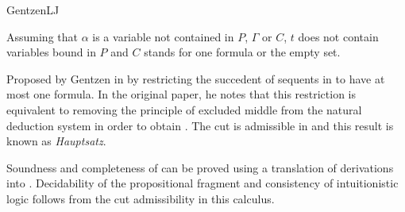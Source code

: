 \begin{entry}{GentzenLJ}
\begin{clarifications}
Assuming that $\alpha$ is a variable not contained in $P$, $\Gamma$ or $C$,
$t$ does not contain variables bound in $P$ and $C$ stands for
one formula or the empty set.
\end{clarifications}

\begin{history}
Proposed by Gentzen in \cite{Gentzen1935} by restricting the
succedent of sequents in  to have at most one
formula. In the original paper, he notes that this restriction is equivalent to
removing the principle of excluded middle from the natural deduction system
 in order to obtain .
The cut is admissible in \LJ and this result is known as \emph{Hauptsatz}.
\end{history}

\begin{technicalities}
Soundness and completeness of \LJ can be proved using a translation of \LJ
derivations into \NJ{}.
Decidability of the propositional fragment and consistency of intuitionistic
logic follows from the cut admissibility in this calculus.
\end{technicalities}







\end{entry}
